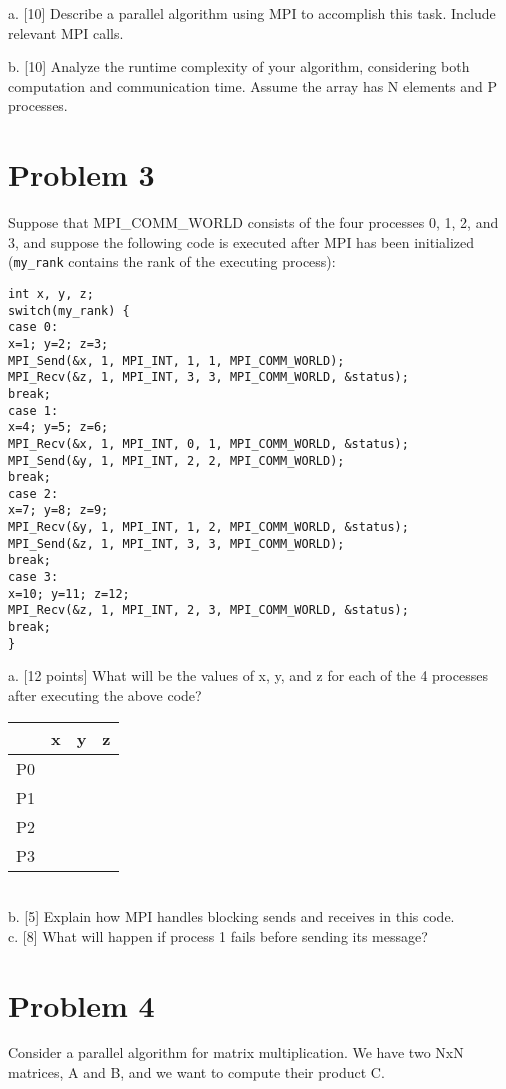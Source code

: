 \documentclass{article}
\begin{document}
a. [10] Describe a parallel algorithm using MPI to accomplish this task.  Include relevant MPI calls.

b. [10] Analyze the runtime complexity of your algorithm, considering both computation and communication time.  Assume the array has N elements and P processes.


\section*{Problem 3}
Suppose that MPI\_COMM\_WORLD consists of the four processes 0, 1, 2, and 3, and suppose the following code is executed after MPI has been initialized (\texttt{my\_rank} contains the rank of the executing process):

\begin{verbatim}
int x, y, z;
switch(my_rank) {
case 0:
x=1; y=2; z=3;
MPI_Send(&x, 1, MPI_INT, 1, 1, MPI_COMM_WORLD);
MPI_Recv(&z, 1, MPI_INT, 3, 3, MPI_COMM_WORLD, &status);
break;
case 1:
x=4; y=5; z=6;
MPI_Recv(&x, 1, MPI_INT, 0, 1, MPI_COMM_WORLD, &status);
MPI_Send(&y, 1, MPI_INT, 2, 2, MPI_COMM_WORLD);
break;
case 2:
x=7; y=8; z=9;
MPI_Recv(&y, 1, MPI_INT, 1, 2, MPI_COMM_WORLD, &status);
MPI_Send(&z, 1, MPI_INT, 3, 3, MPI_COMM_WORLD);
break;
case 3:
x=10; y=11; z=12;
MPI_Recv(&z, 1, MPI_INT, 2, 3, MPI_COMM_WORLD, &status);
break;
}
\end{verbatim}

a. [12 points] What will be the values of x, y, and z for each of the 4 processes after executing the above code?
\begin{tabular}{|c|c|c|c|}
\hline
 & x & y & z \\
\hline
P0 & & & \\
\hline
P1 & & & \\
\hline
P2 & & & \\
\hline
P3 & & & \\
\hline
\end{tabular}
\\
b. [5]  Explain how MPI handles blocking sends and receives in this code. \\
c. [8] What will happen if process 1 fails before sending its message?


\section*{Problem 4}
Consider a parallel algorithm for matrix multiplication. We have two NxN matrices, A and B, and we want to compute their product C.
\end{document}
